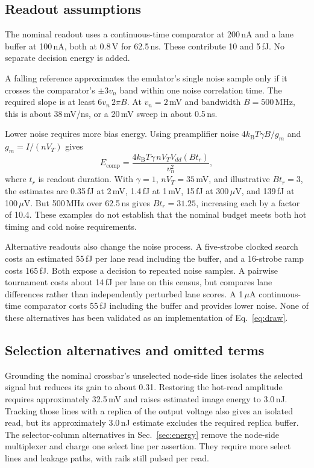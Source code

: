 \documentclass[reprint,amsmath,amssymb,aps,pra,floatfix,nofootinbib]{revtex4-2}
\newcommand{\kB}{k_{\mathrm B}}
\begin{document}
\subsection{Readout assumptions}\label{app:readout}
The nominal readout uses a continuous-time comparator at 200\,nA and a lane buffer at 100\,nA, both at 0.8\,V for 62.5\,ns. These contribute 10 and 5\,fJ. No separate decision energy is added.

A falling reference approximates the emulator's single noise sample only if it crosses the comparator's $\pm3v_n$ band within one noise correlation time. The required slope is at least $6v_n\,2\pi B$. At $v_n=2$\,mV and bandwidth $B=500$\,MHz, this is about 38\,mV/ns, or a 20\,mV sweep in about 0.5\,ns.

Lower noise requires more bias energy. Using preamplifier noise $4\kB T\gamma B/g_m$ and $g_m=I/(nV_T)$ gives
\begin{equation}
E_{\mathrm{comp}}=
\frac{4\kB T\gamma\,nV_TV_{dd}(B t_r)}{v_n^2},
\end{equation}
where $t_r$ is readout duration. With $\gamma=1$, $nV_T=35$\,mV, and illustrative $Bt_r=3$, the estimates are 0.35\,fJ at 2\,mV, 1.4\,fJ at 1\,mV, 15\,fJ at 300\,$\mu$V, and 139\,fJ at 100\,$\mu$V. But 500\,MHz over 62.5\,ns gives $Bt_r=31.25$, increasing each by a factor of 10.4. These examples do not establish that the nominal budget meets both hot timing and cold noise requirements.

Alternative readouts also change the noise process. A five-strobe clocked search costs an estimated 55\,fJ per lane read including the buffer, and a 16-strobe ramp costs 165\,fJ. Both expose a decision to repeated noise samples. A pairwise tournament costs about 14\,fJ per lane on this census, but compares lane differences rather than independently perturbed lane scores. A 1\,$\mu$A continuous-time comparator costs 55\,fJ including the buffer and provides lower noise. None of these alternatives has been validated as an implementation of Eq.~\eqref{eq:draw}.

\subsection{Selection alternatives and omitted terms}
Grounding the nominal crossbar's unselected node-side lines isolates the selected signal but reduces its gain to about 0.31. Restoring the hot-read amplitude requires approximately 32.5\,mV and raises estimated image energy to 3.0\,nJ. Tracking those lines with a replica of the output voltage also gives an isolated read, but its approximately 3.0\,nJ estimate excludes the required replica buffer. The selector-column alternatives in Sec.~\ref{sec:energy} remove the node-side multiplexer and charge one select line per assertion. They require more select lines and leakage paths, with rails still pulsed per read.
\end{document}
